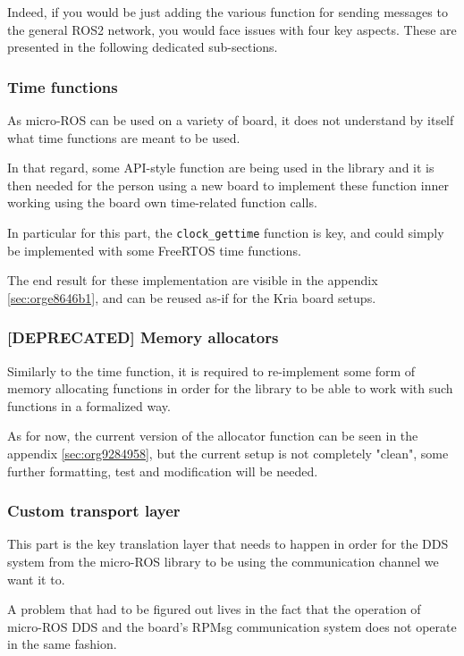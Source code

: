 \documentclass[10pt]{article}
\begin{document}
Indeed, if you would be just adding the various function for sending messages to
the general ROS2 network, you would face issues with four key aspects.
These are presented in the following dedicated sub-sections.

\subsubsection{Time functions}
\label{sec:org7ae0d57}
As micro-ROS can be used on a variety of board, it does not understand by itself
what time functions are meant to be used.

In that regard, some API-style function are being
used in the library and it is then needed for the person using a new board
to implement these function inner working using the board own time-related
function calls.

In particular for this part, the \texttt{clock\_gettime} function is key, and could
simply be implemented with some FreeRTOS time functions.

The end result for these implementation are visible in the appendix \ref{sec:orge8646b1},
and can be reused as-if for the Kria board setups.

\subsubsection{[DEPRECATED] Memory allocators}
\label{sec:org3e51616}
Similarly to the time function, it is required to re-implement some form of memory allocating
functions in order for the library to be able to work with such functions in a formalized way.

As for now, the current version of the allocator function can be seen in the
appendix \ref{sec:org9284958}, but the current setup is not
completely "clean", some further formatting, test and modification will be needed.

\subsubsection{Custom transport layer}
\label{sec:orgfaa5048}
This part is the key translation layer that needs to happen in order for the
DDS system from the micro-ROS library to be using the communication channel we
want it to.

A problem that had to be figured out lives in the fact that the operation of micro-ROS DDS
and the board's RPMsg communication system does not operate in the same fashion.
\end{document}
